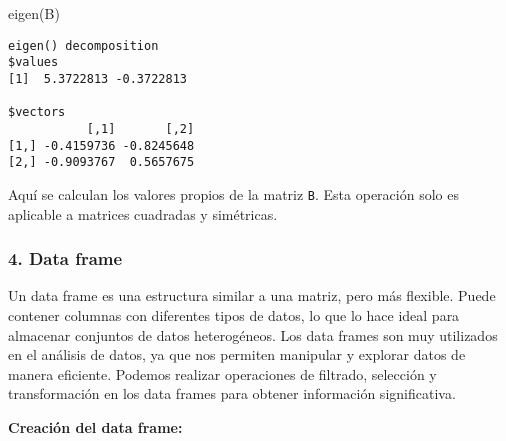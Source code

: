\documentclass[
  a4paper,
]{article}
\newenvironment{Shaded}{}{}
\newcommand{\FunctionTok}[1]{\textcolor[rgb]{0.44,0.26,0.76}{#1}}
\newcommand{\NormalTok}[1]{\textcolor[rgb]{0.14,0.16,0.18}{#1}}
\begin{document}
\begin{enumerate}
\begin{Shaded}
\begin{Highlighting}[]
\FunctionTok{eigen}\NormalTok{(B)}
\end{Highlighting}
\end{Shaded}

\begin{verbatim}
eigen() decomposition
$values
[1]  5.3722813 -0.3722813

$vectors
           [,1]       [,2]
[1,] -0.4159736 -0.8245648
[2,] -0.9093767  0.5657675
\end{verbatim}

  Aquí se calculan los valores propios de la matriz \texttt{B}. Esta
  operación solo es aplicable a matrices cuadradas y simétricas.
\end{enumerate}

\hypertarget{data-frame}{%
\subsubsection{4. Data frame}\label{data-frame}}

Un data frame es una estructura similar a una matriz, pero más flexible.
Puede contener columnas con diferentes tipos de datos, lo que lo hace
ideal para almacenar conjuntos de datos heterogéneos. Los data frames
son muy utilizados en el análisis de datos, ya que nos permiten
manipular y explorar datos de manera eficiente. Podemos realizar
operaciones de filtrado, selección y transformación en los data frames
para obtener información significativa.

\textbf{Creación del data frame:}
\end{document}
